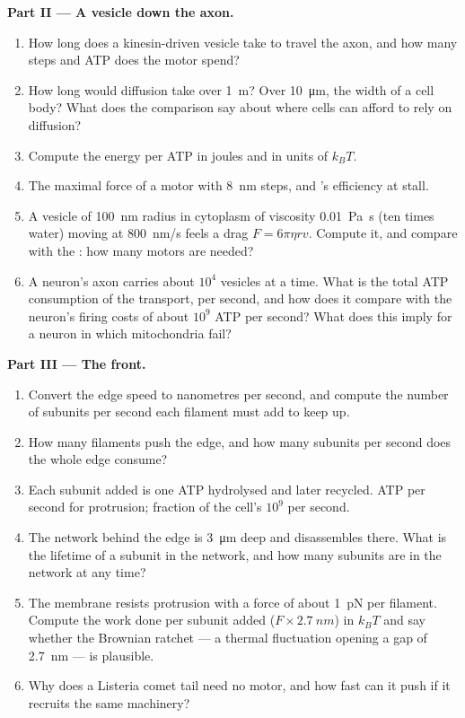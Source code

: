 \begin{problem}
\medskip
\noindent\textbf{Part II --- A vesicle down the axon.}
\begin{enumerate}[resume]
  \item How long does a kinesin-driven vesicle take to travel the axon,
        and how many steps and ATP does the motor spend?
  \item How long would diffusion take over \qty{1}{m}? Over
        \qty{10}{\micro m}, the width of a cell body? What does the
        comparison say about where cells can afford to rely on
        diffusion?
  \item Compute the energy per ATP in joules and in units of $k_{B}T$.
  \item The maximal force of a motor with \qty{8}{nm} steps, and
        's efficiency at stall.
  \item A vesicle of \qty{100}{nm} radius in cytoplasm of viscosity
        \qty{0.01}{Pa.s} (ten times water) moving at \qty{800}{nm/s}
        feels a drag $F = 6\pi\eta r v$. Compute it, and compare with the
        : how many motors are needed?
  \item A neuron's axon carries about $10^{4}$ vesicles at a time. What
        is the total ATP consumption of the transport, per second, and
        how does it compare with the neuron's firing costs of about
        $10^{9}$ ATP per second? What does this imply for a neuron in
        which mitochondria fail?
\end{enumerate}

\medskip
\noindent\textbf{Part III --- The front.}
\begin{enumerate}[resume]
  \item Convert the edge speed to nanometres per second, and compute the
        number of subunits per second each filament must add to keep
        up.
  \item How many filaments push the edge, and how many subunits per
        second does the whole edge consume?
  \item Each subunit added is one ATP hydrolysed and later recycled.
        ATP per second for protrusion; fraction of the cell's $10^{9}$
        per second.
  \item The network behind the edge is \qty{3}{\micro m} deep and
        disassembles there. What is the lifetime of a subunit in the
        network, and how many subunits are in the network at any time?
  \item The membrane resists protrusion with a force of about
        \qty{1}{pN} per filament. Compute the work done per subunit
        added ($F\times \qty{2.7}{nm}$) in $k_{B}T$ and say whether the
        Brownian ratchet --- a thermal fluctuation opening a gap of
        \qty{2.7}{nm} --- is plausible.
  \item Why does a Listeria comet tail need no motor, and how fast can
        it push if it recruits the same machinery?
\end{enumerate}


\end{problem}
